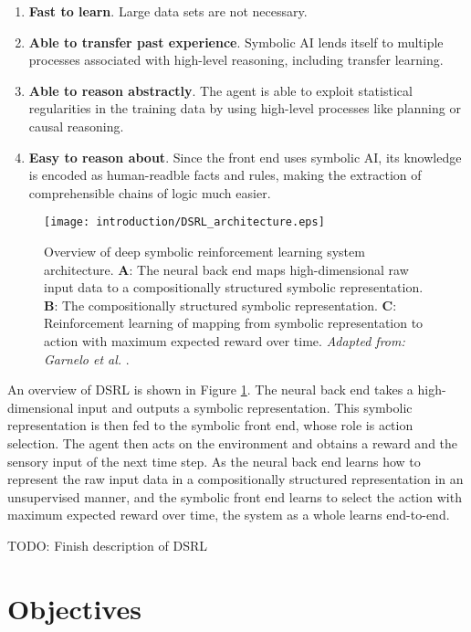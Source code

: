 \begin{enumerate}
\item \textbf{Fast to learn}. Large data sets are not necessary.
\item \textbf{Able to transfer past experience}. Symbolic AI lends itself to multiple processes associated with high-level reasoning, including transfer learning.
\item \textbf{Able to reason abstractly}. The agent is able to exploit statistical regularities in the
training data by using high-level processes like planning or causal reasoning.
\item \textbf{Easy to reason about}. Since the front end uses symbolic AI, its knowledge is encoded as human-readble facts and rules, making the extraction of comprehensible chains of logic much easier.
\end{enumerate}

\begin{figure}[h!]
\centering
\texttt{[image: introduction/DSRL\_architecture.eps]}
\caption{Overview of deep symbolic reinforcement learning system architecture. \textbf{A}: The neural back end maps high-dimensional raw input data to a compositionally structured symbolic representation. \textbf{B}: The compositionally structured symbolic representation. \textbf{C}: Reinforcement learning of mapping from symbolic representation to action with maximum expected reward over time. \textit{Adapted from: Garnelo et al.} \cite{Garnelo2016}.}
\label{fig:dsrl_archiecture}
\end{figure}

An overview of DSRL is shown in Figure \ref{fig:dsrl_archiecture}. The neural back end takes a high-dimensional input and outputs a symbolic representation. This symbolic representation is then fed to the symbolic front end, whose role is action selection. The agent then acts on the environment and obtains a reward and the sensory input of the next time step. As the neural back end learns how to represent the raw input data in a compositionally structured representation in an unsupervised manner, and the symbolic front end learns to select the action with maximum expected reward over time, the system as a whole learns end-to-end.

 TODO: Finish description of DSRL

\section{Objectives}

